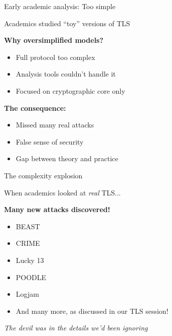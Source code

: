 \documentclass[aspectratio=169, lualatex, handout]{beamer}
\begin{document}
\begin{frame}{Early academic analysis: Too simple}
	\begin{center}
		\Large
		Academics studied ``toy'' versions of TLS
	\end{center}
	\vspace{1em}
	\textbf{Why oversimplified models?}
	\begin{itemize}
		\item Full protocol too complex
		\item Analysis tools couldn't handle it
		\item Focused on cryptographic core only
	\end{itemize}
	\vspace{0.5em}
	\textbf{The consequence:}
	\begin{itemize}
		\item Missed many real attacks
		\item False sense of security
		\item Gap between theory and practice
	\end{itemize}
\end{frame}

\begin{frame}{The complexity explosion}
	\begin{center}
		\Large
		When academics looked at \textit{real} TLS...
	\end{center}
	\vspace{1em}
	\begin{center}
		\textbf{Many new attacks discovered!}
	\end{center}
	\vspace{0.5em}
	\begin{itemize}
		\item BEAST
		\item CRIME
		\item Lucky 13
		\item POODLE
		\item Logjam
		\item And many more, as discussed in our TLS session!
	\end{itemize}
	\vspace{0.5em}
	\begin{center}
		\textit{The devil was in the details we'd been ignoring}
	\end{center}
\end{frame}
\end{document}
